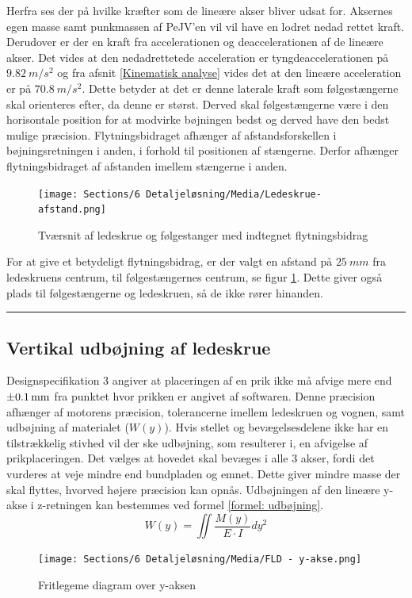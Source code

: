 Herfra ses der på hvilke kræfter som de lineære akser bliver udsat for. Aksernes egen masse samt punkmassen af PeJV'en vil vil have en lodret nedad rettet kraft. Derudover er der en kraft fra accelerationen og deaccelerationen af de lineære akser. Det vides at den nedadrettetede acceleration er tyngdeaccelerationen på $\SI{9,82}{m/s^2}$ og fra afsnit \ref{Kinematisk analyse} vides det at den lineære acceleration er på $\SI{70,8}{m/s^2}$. Dette betyder at det er denne laterale kraft som følgestængerne skal orienteres efter, da denne er størst. Derved skal følgestængerne være i den horisontale position for at modvirke bøjningen bedst og derved have den bedst mulige præcision. Flytningsbidraget afhænger af afstandsforskellen i bøjningsretningen i anden, i forhold til positionen af stængerne. Derfor afhænger flytningsbidraget af afstanden imellem stængerne i anden. 
\begin{figure} [H]
    \centering
\texttt{[image: Sections/6 Detaljeløsning/Media/Ledeskrue-afstand.png]}
    \caption{Tværsnit af ledeskrue og følgestanger med indtegnet flytningsbidrag}
    \label{fig:flytningsbidrag}
\end{figure}
For at give et betydeligt flytningsbidrag, er der valgt en afstand på $\SI{25}{mm}$ fra ledeskruens centrum, til følgestængernes centrum, se figur \ref{fig:flytningsbidrag}. Dette giver også plads til følgestængerne og ledeskruen, så de ikke rører hinanden.




\plainbreak{2}
\subsection{Vertikal udbøjning af ledeskrue} \label{Præcisions beregninger}
Designspecifikation 3 angiver at placeringen af en prik ikke må afvige mere end \(\SI{\pm0,1}{mm}\) fra punktet hvor prikken er angivet af softwaren. Denne præcision afhænger af motorens præcision, tolerancerne imellem ledeskruen og vognen, samt udbøjning af materialet ($W(y)$). Hvis stellet og bevægelsesdelene ikke har en tilstrækkelig stivhed vil der ske udbøjning, som resulterer i, en afvigelse af prikplaceringen. Det vælges at hovedet skal bevæges i alle 3 akser, fordi det vurderes at veje mindre end bundpladen og emnet. Dette giver mindre masse der skal flyttes, hvorved højere præcision kan opnås. Udbøjningen af den lineære y-akse i z-retningen kan bestemmes ved formel \ref{formel: udbøjning}.
\begin{equation} \label{formel: udbøjning}
    W(y)=\iint \frac{M(y)}{E \cdot I} dy^2
\end{equation}
\begin{figure}[H]
    \centering
    \texttt{[image: Sections/6 Detaljeløsning/Media/FLD - y-akse.png]}
    \caption{Fritlegeme diagram over y-aksen}
    \label{fig: FLD y-udbøj}
\end{figure}

